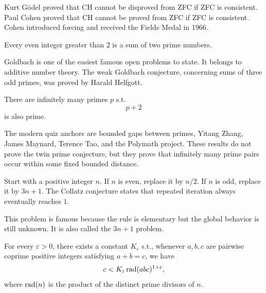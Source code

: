    \begin{remark}
        Kurt Gödel proved that CH cannot be disproved from ZFC if ZFC is
        consistent. Paul Cohen proved that CH cannot be proved from ZFC if ZFC
        is consistent. Cohen introduced forcing and received the Fields Medal in
        1966.
    \end{remark}

    \begin{openproblem}
        Every even integer greater than $2$ is a sum of two prime numbers.
    \end{openproblem}

    \begin{remark}
        Goldbach is one of the easiest famous open problems to state. It belongs
        to additive number theory. The weak Goldbach conjecture, concerning sums
        of three odd primes, was proved by Harald Helfgott.
    \end{remark}

    \begin{openproblem}
        There are infinitely many primes $p$ s.t.
        \[
            p+2
        \]
        is also prime.
    \end{openproblem}

    \begin{remark}
        The modern quiz anchors are bounded gaps between primes, Yitang Zhang,
        James Maynard, Terence Tao, and the Polymath project. These results do
        not prove the twin prime conjecture, but they prove that infinitely many
        prime pairs occur within some fixed bounded distance.
    \end{remark}

    \begin{openproblem}
        Start with a positive integer $n$. If $n$ is even, replace it by $n/2$.
        If $n$ is odd, replace it by $3n+1$. The Collatz conjecture states that
        repeated iteration always eventually reaches $1$.
    \end{openproblem}

    \begin{remark}
        This problem is famous because the rule is elementary but the global
        behavior is still unknown. It is also called the $3n+1$ problem.
    \end{remark}

    \begin{conjecture}
        For every $\varepsilon>0$, there exists a constant $K_{\varepsilon}$ s.t., whenever $a,b,c$ are pairwise coprime positive integers satisfying
        $a+b=c$, we have
        \[
            c<K_{\varepsilon} \operatorname{rad}(abc)^{1+\varepsilon},
        \]
        where $\operatorname{rad}(n)$ is the product of the distinct prime
        divisors of $n$.
    \end{conjecture}

